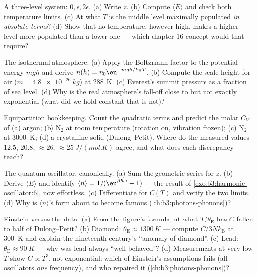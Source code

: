 \begin{exercise}[$\star$]\label{exo:b3:canonical-ensemble:2}
A three-level system: $0, \epsilon, 2\epsilon$. (a) Write $z$. (b)
Compute $\langle E\rangle$ and check both temperature limits. (c)
At what $T$ is the middle level maximally populated \emph{in
absolute terms}? (d) Show that no temperature, however high, makes
a higher level more populated than a lower one --- which chapter-16
concept would that require?
\end{exercise}

\begin{exercise}[$\star$]\label{exo:b3:canonical-ensemble:3}
The isothermal atmosphere. (a) Apply the Boltzmann factor to the
potential energy $mgh$ and derive $n(h) = n_0\eu^{-mgh/k_{\text{B}}
T}$. (b) Compute the scale height for air ($m = \qty{4.8e-26}{kg}$)
at \qty{288}{K}. (c) Everest's summit pressure as a fraction of sea
level. (d) Why is the real atmosphere's fall-off close to but not
exactly exponential (what did we hold constant that is not)?
\end{exercise}

\begin{exercise}[$\star$]\label{exo:b3:canonical-ensemble:4}
Equipartition bookkeeping. Count the quadratic terms and predict
the molar $C_V$ of (a) argon; (b) N$_2$ at room temperature
(rotation on, vibration frozen); (c) N$_2$ at \qty{3000}{K}; (d) a
crystalline solid (Dulong--Petit). Where do the measured values
$12.5$, $20.8$, $\approx26$, $\approx\qty{25}{J/(mol.K)}$ agree,
and what does each discrepancy teach?
\end{exercise}

\begin{exercise}[$\star\star$]\label{exo:b3:canonical-ensemble:5}
The quantum oscillator, canonically. (a) Sum the geometric series
for $z$. (b) Derive $\langle E\rangle$ and identify $\langle
n\rangle = 1/(\eu^{\beta\hbar\omega} - 1)$ --- the result of
\cref{exo:b3:harmonic-oscillator:6}, now effortless. (c)
Differentiate for $C(T)$ and verify the two limits. (d) Why is
$\langle n\rangle$'s form about to become famous
(\cref{ch:b3:photons-phonons})?
\end{exercise}

\begin{exercise}[$\star\star$]\label{exo:b3:canonical-ensemble:6}
Einstein versus the data. (a) From the figure's formula, at what
$T/\theta_{\text{E}}$ has $C$ fallen to half of Dulong--Petit? (b)
Diamond: $\theta_{\text{E}} \approx \qty{1300}{K}$ --- compute
$C/3Nk_{\text{B}}$ at \qty{300}{K} and explain the nineteenth
century's ``anomaly of diamond''. (c) Lead: $\theta_{\text{E}}
\approx \qty{90}{K}$ --- why was lead always ``well-behaved''? (d)
Measurements at very low $T$ show $C \propto T^3$, not
exponential: which of Einstein's assumptions fails (all
oscillators \emph{one} frequency), and who repaired it
(\cref{ch:b3:photons-phonons})?
\end{exercise}


